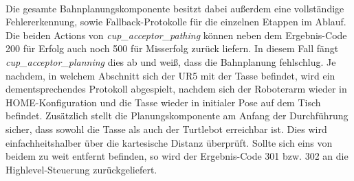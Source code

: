 \newline \\
Die gesamte Bahnplanungskomponente besitzt dabei außerdem eine vollständige Fehlererkennung, sowie Fallback-Protokolle für die einzelnen Etappen im Ablauf. Die beiden Actions von \textit{cup\_acceptor\_pathing} können neben dem Ergebnis-Code 200 für Erfolg auch noch 500 für Misserfolg zurück liefern. In diesem Fall fängt \textit{cup\_acceptor\_planning} dies ab und weiß, dass die Bahnplanung fehlschlug. Je nachdem, in welchem Abschnitt sich der UR5 mit der Tasse befindet, wird ein dementsprechendes Protokoll abgespielt, nachdem sich der Roboterarm wieder in HOME-Konfiguration und die Tasse wieder in initialer Pose auf dem Tisch befindet. Zusätzlich stellt die Planungskomponente am Anfang der Durchführung sicher, dass sowohl die Tasse als auch der Turtlebot erreichbar ist. Dies wird einfachheitshalber über die kartesische Distanz überprüft. Sollte sich eins von beidem zu weit entfernt befinden, so wird der Ergebnis-Code 301 bzw. 302 an die Highlevel-Steuerung zurückgeliefert.
